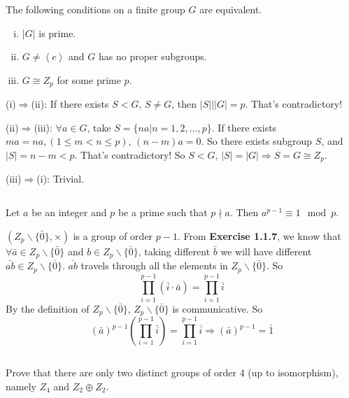 $$ $$

\begin{ex}
    The following conditions on a finite group $G$ are equivalent.
    \begin{enumerate}[(i)]
        \item $\left| G \right| $ is prime.
        \item $G\neq \left\langle e\right\rangle$ and $G$ has no proper subgroups.
        \item $G\cong Z_{p}$ for some prime $p$.
    \end{enumerate}
\end{ex}

\begin{answer}
    (i)$\Rightarrow$(ii): If there exists $S<G$, $S\neq G$, then $\left| S \right| | \left| G \right| =p$. That's contradictory!

    (ii)$\Rightarrow$(iii): $\forall a\in G$, take $S=\{na|n=1,2,\dots,p\}$. If there exists $ma=na,(1\leq m<n\leq p)$, $(n-m)a=0$. So there exists subgroup $S$, and $\left| S \right|=n-m <p$. That's contradictory! So $S<G$, $\left| S \right| =\left| G \right| \Rightarrow S=G\cong Z_{p}$.

    (iii)$\Rightarrow$(i): Trivial.
\end{answer}

$$ $$

\begin{ex}
    Let $a$ be an integer and $p$ be a prime such that $p\nmid a$. Then $a^{p-1}\equiv 1\mod p$.
\end{ex}

\begin{answer}
    $(Z_{p}\backslash\{\bar{0}\},\times)$ is a group of order $p-1$. From \textbf{Exercise 1.1.7}, we know that $\forall \bar{a}\in Z_{p}\backslash\{\bar{0}\}$ and $b\in Z_{p}\backslash\{\bar{0}\}$, taking different $\bar{b}$ we will have different $\bar{ab}\in Z_{p}\backslash\{\bar{0}\}$. $\bar{ab}$ travels through all the elements in $Z_{p}\backslash\{\bar{0}\}$. So \[\prod_{i=1}^{p-1}(\bar{i}\cdot\bar{a})=\prod_{i=1}^{p-1}\bar{i}\] By the definition of $Z_{p}\backslash\{\bar{0}\}$, $Z_{p}\backslash\{\bar{0}\}$ is communicative. So \[(\bar{a})^{p-1}(\prod_{i=1}^{p-1}\bar{i})=\prod_{i=1}^{p-1}\bar{i}\Rightarrow(\bar{a})^{p-1}=\bar{1}\]
\end{answer}

$$ $$

\begin{ex}
    Prove that there are only two distinct groups of order 4 (up to isomorphism), namely $Z_{4}$ and $Z_{2}\oplus Z_{2}$.
\end{ex}

